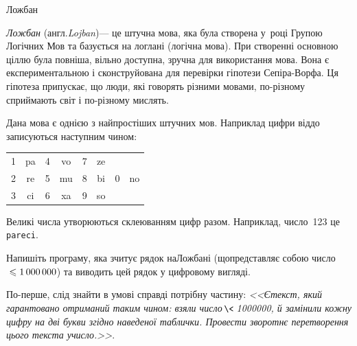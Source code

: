 \documentclass[14pt,a4paper]{extarticle}
\def\dib#1{\,#1\discretionary{}{\mbox{$#1$}}{}\,}
\begin{document}
\begin{problemAllDefault}{Ложбан}

\emph{Ложбан} (англ.\nolinebreak[3] \emph{Lojban})\nolinebreak[3] --- це штучна мова, яка була створена у~році Групою Логічних Мов та базується на логлані (логічна мова). При створенні основною ціллю була повніша, вільно доступна, зручна для використання мова. Вона є експериментальною і сконструйована для перевірки гіпотези Сепіра-Ворфа. Ця гіпотеза припускає, що люди, які говорять різними мовами, по-різному сприймають світ і по-різному мислять.

Дана мова є однією з найпростіших штучних мов. Наприклад цифри від\nolinebreak[1] до записуються наступним чином:

\vspace{-0.25\baselineskip plus 6pt minus 6pt}

\begin{center}
\begin{ttfamily}
\begin{tabular}{cc@{ ~ ~ ~ }cc@{ ~ ~ ~ }cc@{ ~ ~ ~ }cc}
1 & pa	&	4 & vo	&	7 & ze				\\
2 & re	&	5 & mu	&	8 & bi	&	0 & no	\\
3 & ci	&	6 & xa	&	9 & so				
\end{tabular}
\end{ttfamily}

\end{center}

\vspace{-0.25\baselineskip plus 6pt minus 6pt}

Великі числа утворюються склеюванням цифр разом. Наприклад, число~123 це \texttt{pareci}.

\Task	\hspace{0pt minus 0.5em}Напишіть програму, яка зчитує рядок на\nolinebreak[2] Ложбані (що\nolinebreak[3] представляє собою число${}\leqslant1\,000\,000$) та виводить цей рядок у цифровому вигляді.

\Example
\begin{exampleSimple}{5em}{3em}%
%
\end{exampleSimple}

\end{problemAllDefault}
	

\Tutorial	По-перше, слід знайти в умові справді потрібну частину: \textsl{<<Є\nolinebreak[3] текст, який гарантовано отриманий таким чином: взяли число$\dib{{\<}}$1000000, й замінили кожну цифру на дві букви згідно наведеної таблички. Провести зворотнє перетворення цього текста у\nolinebreak[3] число.>>}.
\end{document}

